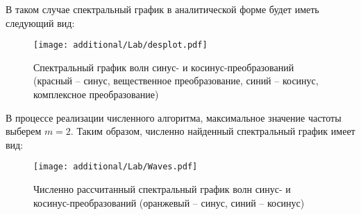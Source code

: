 		В таком случае спектральный график в аналитической форме будет иметь следующий вид:
		\begin{figure}[H]
			\centering
			\texttt{[image: additional/Lab/desplot.pdf]}
			\caption{Спектральный график волн синус- и косинус-преобразований (красный -- синус, вещественное преобразование, синий -- косинус, комплексное преобразование)}
		\end{figure}

		В процессе реализации численного алгоритма, максимальное значение частоты выберем $m = 2$. Таким образом, численно найденный спектральный график имеет вид:
		\begin{figure}[H]
			\centering
			\texttt{[image: additional/Lab/Waves.pdf]}
			\caption{Численно рассчитанный спектральный график волн синус- и косинус-преобразований (оранжевый -- синус, синий -- косинус)}
		\end{figure}